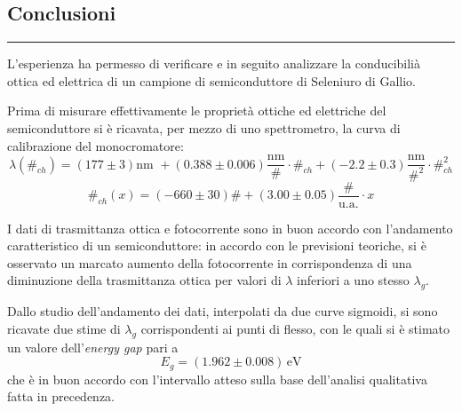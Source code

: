 \newpage
\begin{center}
\section{Conclusioni}
\medskip
\end{center}
{\color{gray}\hrule}
\medskip
L'esperienza ha permesso di verificare e in seguito analizzare la conducibilià ottica ed elettrica di un campione di semiconduttore di Seleniuro di Gallio.

Prima di misurare effettivamente le proprietà ottiche ed elettriche del semiconduttore si è
ricavata, per mezzo di uno spettrometro, la curva di calibrazione del monocromatore:
$$\lambda (\#_{ch}) = (  177 \pm 3)\text{nm } + ( 0.388 \pm 0.006 )\frac{\text{nm}}{\#} \cdot \#_{ch}  +  (  -2.2 \pm 0.3 ) \frac{\text{nm}}{\#^2} \cdot \#_{ch}^2$$
$$\#_{ch} (x) = ( -660 \pm 30)\# + ( 3.00 \pm 0.05 )\frac{\#}{\text{u.a.}} \cdot x$$

I dati di trasmittanza ottica e fotocorrente sono in buon accordo con l'andamento caratteristico di un semiconduttore: in accordo con le previsioni teoriche, si è osservato un marcato aumento della fotocorrente in corrispondenza di una diminuzione della trasmittanza ottica per valori di $\lambda$ inferiori a uno stesso $\lambda_g$. 

Dallo studio dell'andamento dei dati, interpolati da due curve sigmoidi, si sono ricavate 
due stime di $\lambda_g$ corrispondenti ai punti di flesso, con le quali si è stimato
un valore dell'\textit{energy gap} pari a $$E_g = (1.962 \pm 0.008)\,\text{eV}$$
che è in buon accordo con l’intervallo atteso sulla base dell'analisi qualitativa fatta in precedenza.


